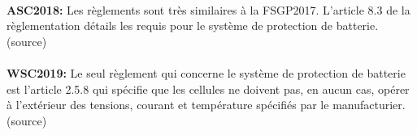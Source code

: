 		\paragraph{}
		\textbf{ASC2018:} Les règlements sont très similaires à la FSGP2017. L'article 8.3 de la règlementation détails les requis pour le système de protection de batterie. (source)
		
		\paragraph{}
		\textbf{WSC2019:} Le seul règlement qui concerne le système de protection de batterie est l'article 2.5.8 qui spécifie que les cellules ne doivent pas, en aucun cas, opérer à l'extérieur des tensions, courant et température spécifiés par le manufacturier. (source)
		

